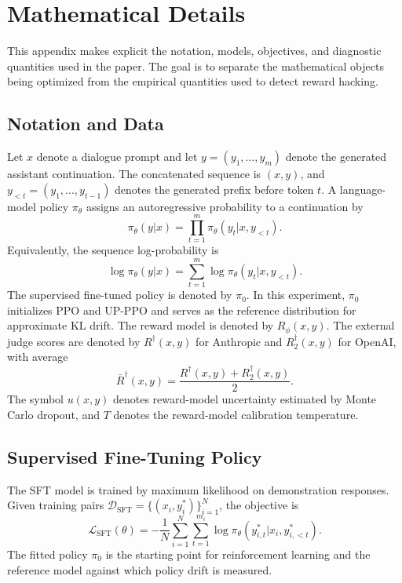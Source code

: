 \documentclass[twocolumn,10pt]{article}
\newcommand{\Rphi}{R_{\phi}}
\newcommand{\Rdag}{R^{\dagger}}
\newcommand{\Rtwo}{R^{\dagger}_2}
\begin{document}
\section{Mathematical Details}
This appendix makes explicit the notation, models, objectives, and diagnostic quantities used in the paper. The goal is to separate the mathematical objects being optimized from the empirical quantities used to detect reward hacking.

\subsection{Notation and Data}
Let $x$ denote a dialogue prompt and let $y=(y_1,\ldots,y_m)$ denote the generated assistant continuation. The concatenated sequence is $(x,y)$, and $y_{<t}=(y_1,\ldots,y_{t-1})$ denotes the generated prefix before token $t$. A language-model policy $\pi_\theta$ assigns an autoregressive probability to a continuation by
\begin{equation}
    \pi_\theta(y|x)=\prod_{t=1}^{m}\pi_\theta(y_t|x,y_{<t}).
\end{equation}
Equivalently, the sequence log-probability is
\begin{equation}
    \log \pi_\theta(y|x)=\sum_{t=1}^{m}\log \pi_\theta(y_t|x,y_{<t}).
\end{equation}
The supervised fine-tuned policy is denoted by $\pi_0$. In this experiment, $\pi_0$ initializes PPO and UP-PPO and serves as the reference distribution for approximate KL drift. The reward model is denoted by $\Rphi(x,y)$. The external judge scores are denoted by $\Rdag(x,y)$ for Anthropic and $\Rtwo(x,y)$ for OpenAI, with average
\begin{equation}
    \bar R^\dagger(x,y)=\frac{\Rdag(x,y)+\Rtwo(x,y)}{2}.
\end{equation}
The symbol $u(x,y)$ denotes reward-model uncertainty estimated by Monte Carlo dropout, and $T$ denotes the reward-model calibration temperature.

\subsection{Supervised Fine-Tuning Policy}
The SFT model is trained by maximum likelihood on demonstration responses. Given training pairs $\mathcal{D}_{\mathrm{SFT}}=\{(x_i,y_i^*)\}_{i=1}^{N}$, the objective is
\begin{equation}
    \mathcal{L}_{\mathrm{SFT}}(\theta)
    =-\frac{1}{N}\sum_{i=1}^{N}\sum_{t=1}^{m_i}
      \log \pi_\theta(y^*_{i,t}|x_i,y^*_{i,<t}).
\end{equation}
The fitted policy $\pi_0$ is the starting point for reinforcement learning and the reference model against which policy drift is measured.
\end{document}
